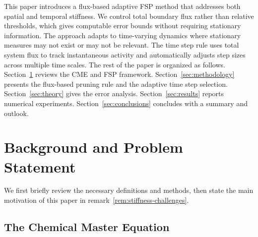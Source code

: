\documentclass[review,onefignum,onetabnum]{siamart171218}
\begin{document}
This paper introduces a flux-based adaptive FSP method that addresses both spatial and temporal stiffness. We control total boundary flux rather than relative thresholds, which gives computable error bounds without requiring stationary information. The approach adapts to time-varying dynamics where stationary measures may not exist or may not be relevant. The time step rule uses total system flux to track instantaneous activity and automatically adjusts step sizes across multiple time scales. The rest of the paper is organized as follows. Section~\ref{sec:background} reviews the CME and FSP framework. Section~\ref{sec:methodology} presents the flux-based pruning rule and the adaptive time step selection. Section~\ref{sec:theory} gives the error analysis. Section~\ref{sec:results} reports numerical experiments. Section~\ref{sec:conclusions} concludes with a summary and outlook.


\section{Background and Problem Statement}
\label{sec:background}

We first briefly review the necessary definitions and methods, then state the main motivation of this paper in remark~\ref{rem:stiffness-challenges}. 

\subsection{The Chemical Master Equation}
\end{document}
